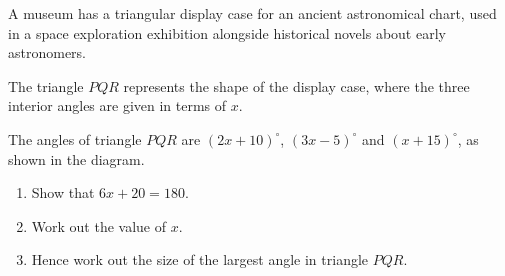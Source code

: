 \begin{question}
\noindent A museum has a triangular display case for an ancient astronomical chart, used in a space exploration exhibition alongside historical novels about early astronomers.

The triangle $PQR$ represents the shape of the display case, where the three interior angles are given in terms of $x$.

\begin{center}
\end{center}

\noindent The angles of triangle $PQR$ are $(2x+10)^\circ$, $(3x-5)^\circ$ and $(x+15)^\circ$, as shown in the diagram.

\begin{enumerate}
    \item[(a)] Show that $6x + 20 = 180$.
    \vspace{2.5cm}

    \item[(b)] Work out the value of $x$.
    \vspace{2.5cm}

    \item[(c)] Hence work out the size of the largest angle in triangle $PQR$.
    \vspace{3cm}
\end{enumerate}
\end{question}
